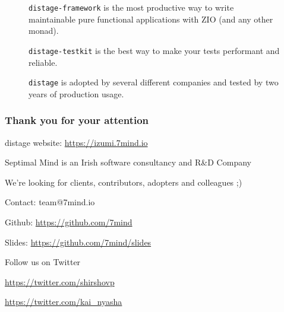 \documentclass[usenames,dvipsnames]{beamer}
\newcommand{\distage}{\texttt{distage}\xspace}
\begin{document}
\begin{frame}
  \begin{figure}
    \texttt{distage-framework} is the most productive way to write maintainable pure functional applications with ZIO (and any other monad).
  \end{figure}
  \begin{figure}
    \texttt{distage-testkit} is the best way to make your tests performant and reliable.
  \end{figure}
  \begin{figure}
    \distage is adopted by several different companies and tested by two years of production usage.
  \end{figure}
\end{frame}

\begin{frame}
    \frametitle{Thank you for your attention}
    \begin{center}
      distage website: \url{https://izumi.7mind.io}
    \end{center}
    \begin{center}
      \color{RubineRed}
      Septimal Mind is an Irish software consultancy and R\&D Company

      \vspace{0.3cm}
      We're looking for clients, contributors, adopters and colleagues ;)
    \end{center}
    \begin{center}
      Contact: team@7mind.io

      \vspace{0.3cm}
      Github: \url{https://github.com/7mind}

      \vspace{0.3cm}
      Slides: \url{https://github.com/7mind/slides}
    \end{center}
    \begin{center}
      \color{RoyalBlue}
      Follow us on Twitter

      \vspace{0.3cm}
      \url{https://twitter.com/shirshovp}

      \vspace{0.3cm}
      \url{https://twitter.com/kai_nyasha}
    \end{center}
\end{frame}
\end{document}
